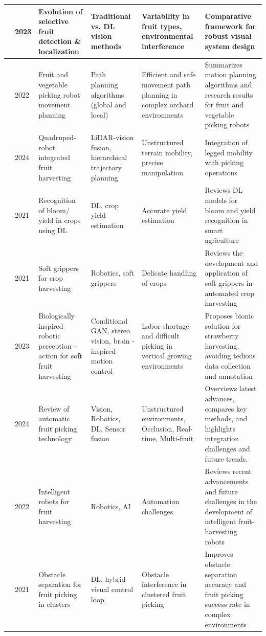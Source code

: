 \documentclass[a4paper,fleqn]{cas-dc}
\begin{document}
\begin{table}[ht]
\begin{tabular} {p{0.4cm}p{0.5cm}p{3cm}p{3.2cm}p{3cm}p{4.5cm}}
\cite{suresh2023selective} & 2023 & Evolution of selective fruit detection \& localization & Traditional vs. DL vision methods & Variability in fruit types, environmental interference & Comparative framework for robust visual system design \\ \midrule
\cite{gai2022fruit} & 2022 & Fruit and vegetable picking robot movement planning & Path planning algorithms (global and local) & Efficient and safe movement path planning in complex orchard environments & Summarizes motion planning algorithms and research results for fruit and vegetable picking robots \\ \midrule
\cite{liu2024hierarchical} & 2024 & Quadruped-robot integrated fruit harvesting & LiDAR-vision fusion, hierarchical trajectory planning & Unstructured terrain mobility, precise manipulation & Integration of legged mobility with picking operations \\ \midrule
\cite{darwin2021recognition} & 2021 & Recognition of bloom/ yield in crops using DL & DL, crop yield estimation & Accurate yield estimation & Reviews DL models for bloom and yield recognition in smart agriculture \\ \midrule
\cite{navas2021soft} & 2021 & Soft grippers for crop harvesting & Robotics, soft grippers & Delicate handling of crops & Reviews the development and application of soft grippers in automated crop harvesting \\ \midrule
\cite{wang2023biologically} & 2023 & Biologically inspired robotic perception - action for soft fruit harvesting & Conditional GAN, stereo vision, brain - inspired motion control & Labor shortage and difficult picking in vertical growing environments & Proposes bionic solution for strawberry harvesting, avoiding tedious data collection and annotation \\ \midrule
\cite{zhang2024automatic} & 2024 & Review of automatic fruit picking technology & Vision, Robotics, DL, Sensor fusion & Unstructured environments, Occlusion, Real-time, Multi-fruit & Overviews latest advances, compares key methods, and highlights integration challenges and future trends. \\   \midrule
\cite{zhou2022intelligent} & 2022 & Intelligent robots for fruit harvesting & Robotics, AI & Automation challenges & Reviews recent advancements and future challenges in the development of intelligent fruit-harvesting robots \\ \midrule
\cite{xiong2021improved} & 2021 & Obstacle separation for fruit picking in clusters & DL, hybrid visual control loop & Obstacle interference in clustered fruit picking & Improves obstacle separation accuracy and fruit picking success rate in complex environments \\ \midrule

\end{tabular}
\end{table}
\end{document}
